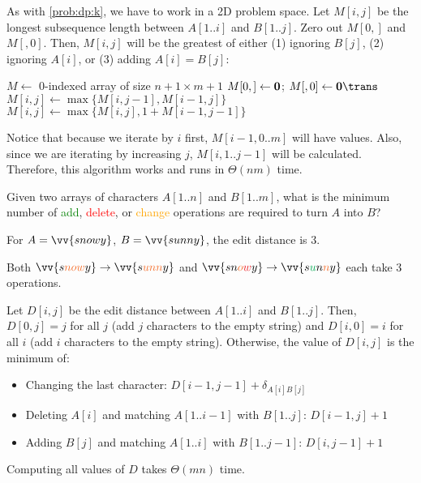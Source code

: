 As with \cref{prob:dp:k}, we have to work in a 2D problem space.
Let $M[i,j]$ be the longest subsequence length between $A[1..i]$ and $B[1..j]$.
Zero out $M[0,]$ and $M[,0]$.
Then, $M[i,j]$ will be the greatest of either
(1) ignoring $B[j]$, (2) ignoring $A[i]$, or (3) adding $A[i] = B[j]$:

\begin{algorithm}
  \caption{}
  \begin{algorithmic}[1]
    \State $M \gets$ 0-indexed array of size $n+1 \times m+1$
    \State $M[0,] \gets \vb{0}$; $M[,0] \gets \vb{0}\trans$
        \State $M[i,j] \gets \max\{M[i,j-1], M[i-1,j]\}$
          \State $M[i,j] \gets \max\{M[i,j], 1 + M[i-1,j-1]\}$
        \EndIf
      \EndFor
    \EndFor
    \State {}
  \end{algorithmic}
\end{algorithm}

Notice that because we iterate by $i$ first, $M[i-1,0..m]$ will have values.
Also, since we are iterating by increasing $j$, $M[i,1..j-1]$ will be calculated.
Therefore, this algorithm works and runs in $\Theta(nm)$ time.

\begin{problem}
  Given two arrays of characters $A[1..n]$ and $B[1..m]$,
  what is the minimum number of
  \textcolor{Green}{add}, \textcolor{Red}{delete}, or \textcolor{Orange}{change}
  operations are required to turn $A$ into $B$?
\end{problem}

\begin{example}
  For $A = \vv{snowy}$, $B = \vv{sunny}$, the edit distance is 3.

  Both $\vv{s{\color{Orange}now}y} \to \vv{s{\color{Orange}unn}y}$ and
  $\vv{sn{\color{Orange}o}{\color{Red}w}y} \to \vv{s{\color{Green}u}n{\color{Orange}n}y}$
  each take 3 operations.
\end{example}

Let $D[i,j]$ be the edit distance between $A[1..i]$ and $B[1..j]$.
Then, $D[0,j] = j$ for all $j$ (add $j$ characters to the empty string)
and $D[i,0] = i$ for all $i$ (add $i$ characters to the empty string).
Otherwise, the value of $D[i,j]$ is the minimum of:
\begin{itemize}[nosep]
  \item Changing the last character: $D[i-1,j-1] + \delta_{A[i]B[j]}$
  \item Deleting $A[i]$ and matching $A[1..i-1]$ with $B[1..j]$: $D[i-1,j]+1$
  \item Adding $B[j]$ and matching $A[1..i]$ with $B[1..j-1]$: $D[i,j-1]+1$
\end{itemize}
Computing all values of $D$ takes $\Theta(mn)$ time.

